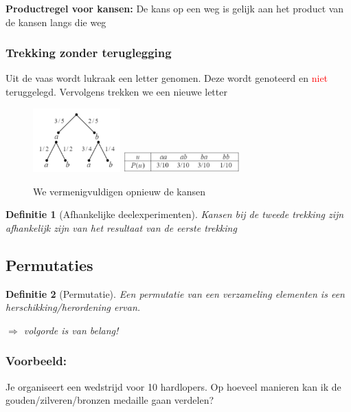 \documentclass{article}
\newtheorem{theorem}{Definitie}[section]
\begin{document}
\textbf{Productregel voor kansen:} De kans op een weg is gelijk aan het product van de kansen langs die weg
    

\subsubsection{Trekking zonder teruglegging}

Uit de vaas wordt lukraak een letter genomen. Deze wordt genoteerd en \textcolor{red}{niet} teruggelegd.
Vervolgens trekken we een nieuwe letter

\begin{figure}[H]
    \centering
    \includegraphics[width=0.3\textwidth]{trekking-zonder-teruglegging-kansboom.png}
    \includegraphics[width=0.4\textwidth]{trekking-zonder-teruglegging-tabel.png}
    \caption{We vermenigvuldigen opnieuw de kansen}
\end{figure}


\begin{theorem}[Afhankelijke deelexperimenten]
    Kansen bij de tweede trekking zijn afhankelijk zijn van het resultaat van de eerste trekking
\end{theorem}

\subsection{Permutaties}

\begin{theorem}[Permutatie]
    Een permutatie van een verzameling elementen is een herschikking/herordening ervan.

    $\Rightarrow$ volgorde is van belang! 
\end{theorem}

\subsubsection{Voorbeeld:} 

Je organiseert een wedstrijd voor 10 hardlopers. 
Op hoeveel manieren kan ik de gouden/zilveren/bronzen medaille gaan verdelen?
\end{document}
